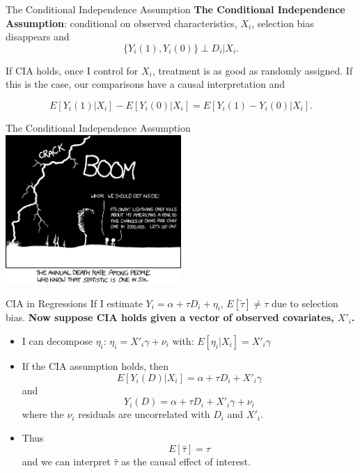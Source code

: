 \documentclass[
  ignorenonframetext,
]{beamer}
\begin{document}
\begin{frame}{The Conditional Independence Assumption}
\protect\hypertarget{the-conditional-independence-assumption-4}{}
\textbf{The Conditional Independence Assumption}: conditional on
observed characteristics, \(X_i\), selection bias disappears and \[
\{Y_i(1), Y_i(0)\} \perp  D_i|X_i.
\]

If CIA holds, once I control for \(X_i\), treatment is as good as
randomly assigned. If this is the case, our comparisons have a causal
interpretation and

\[
E[Y_i(1)|X_i]-E[Y_i(0)|X_i]=E[Y_i(1)-Y_i(0)|X_i].
\]
\end{frame}

\begin{frame}{The Conditional Independence Assumption}
\protect\hypertarget{the-conditional-independence-assumption-5}{}
\center \includegraphics[width=0.5\textwidth,height=\textheight]{"images/ciacomic.png"}
\end{frame}

\begin{frame}{CIA in Regressions}
\protect\hypertarget{cia-in-regressions}{}
If I estimate \(Y_i=\alpha+\tau D_i +\eta_i\),
\(E[\tilde{\tau}]\neq \tau\) due to selection bias. \textbf{Now suppose
CIA holds given a vector of observed covariates, \(X'_i\).}

\begin{itemize}
\item
  I can decompose \(\eta_i\): \(\eta_i=X'_i\gamma+\nu_i\) with:
  \(E[\eta_i|X_i]=X'_i\gamma\)
\item
  If the CIA assumption holds, then \[
  E[Y_i(D)|X_i]=\alpha+\tau D_i+X'_i \gamma
  \] and \[
  Y_i(D)=\alpha+\tau D_i+X'_i \gamma+\nu_i
  \] where the \(\nu_i\) residuals are uncorrelated with \(D_i\) and
  \(X'_i\).
\item
  Thus \[
  E[\hat{\tau}]=\tau
  \] and we can interpret \(\hat{\tau}\) as the causal effect of
  interest.
\end{itemize}
\end{frame}
\end{document}
